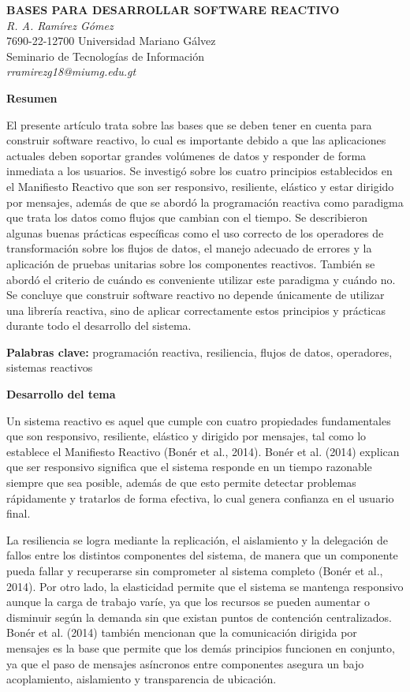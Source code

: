 \documentclass[12pt,letterpaper]{article}
\newcommand{\subtitulo}[1]{\noindent\textbf{#1}\par\vspace{2pt}}
\begin{document}
\begin{center}
\textbf{BASES PARA DESARROLLAR SOFTWARE REACTIVO}\\[8pt]
\textit{R. A. Ramírez Gómez}\\
7690-22-12700 Universidad Mariano Gálvez\\
Seminario de Tecnologías de Información\\
\textit{rramirezg18@miumg.edu.gt}
\end{center}

\vspace{10pt}

\subtitulo{Resumen}
El presente artículo trata sobre las bases que se deben tener en cuenta para construir software reactivo, lo cual es importante debido a que las aplicaciones actuales deben soportar grandes volúmenes de datos y responder de forma inmediata a los usuarios. Se investigó sobre los cuatro principios establecidos en el Manifiesto Reactivo que son ser responsivo, resiliente, elástico y estar dirigido por mensajes, además de que se abordó la programación reactiva como paradigma que trata los datos como flujos que cambian con el tiempo. Se describieron algunas buenas prácticas específicas como el uso correcto de los operadores de transformación sobre los flujos de datos, el manejo adecuado de errores y la aplicación de pruebas unitarias sobre los componentes reactivos. También se abordó el criterio de cuándo es conveniente utilizar este paradigma y cuándo no. Se concluye que construir software reactivo no depende únicamente de utilizar una librería reactiva, sino de aplicar correctamente estos principios y prácticas durante todo el desarrollo del sistema.

\noindent\textbf{Palabras clave:} programación reactiva, resiliencia, flujos de datos, operadores, sistemas reactivos

\vspace{6pt}

\subtitulo{Desarrollo del tema}

Un sistema reactivo es aquel que cumple con cuatro propiedades fundamentales que son responsivo, resiliente, elástico y dirigido por mensajes, tal como lo establece el Manifiesto Reactivo (Bonér et al., 2014). Bonér et al. (2014) explican que ser responsivo significa que el sistema responde en un tiempo razonable siempre que sea posible, además de que esto permite detectar problemas rápidamente y tratarlos de forma efectiva, lo cual genera confianza en el usuario final.

La resiliencia se logra mediante la replicación, el aislamiento y la delegación de fallos entre los distintos componentes del sistema, de manera que un componente pueda fallar y recuperarse sin comprometer al sistema completo (Bonér et al., 2014). Por otro lado, la elasticidad permite que el sistema se mantenga responsivo aunque la carga de trabajo varíe, ya que los recursos se pueden aumentar o disminuir según la demanda sin que existan puntos de contención centralizados. Bonér et al. (2014) también mencionan que la comunicación dirigida por mensajes es la base que permite que los demás principios funcionen en conjunto, ya que el paso de mensajes asíncronos entre componentes asegura un bajo acoplamiento, aislamiento y transparencia de ubicación.
\end{document}
